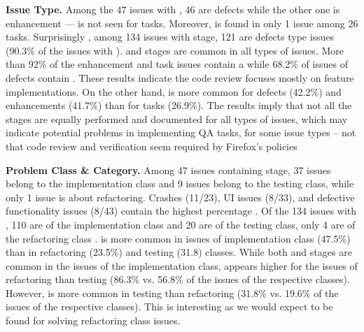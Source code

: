 \textbf{Issue Type.}
Among the 47 issues with \ir, 46 are defects while the other one is enhancement --- \ir is not seen for tasks. Moreover, \ia is found in only 1 issue among 26 tasks. Surprisingly , among 134 issues with \ia stage, 121 are defects type issues (90.3\% of the issues with \ia). \sd and \impl stages are common in all types of issues. More than 92\% of the enhancement and task issues contain a \crv while 68.2\% of issues of defects contain \crv. These results indicate the code review focuses mostly on feature implementations. 
On the other hand, \ver is more common for defects (42.2\%) and enhancements (41.7\%) than  for tasks (26.9\%). The results imply that not all the stages are equally performed and documented for all types of issues, which may indicate potential problems in implementing QA tasks, for some issue types -- not that code review and verification seem  required by Firefox's policies


\textbf{Problem Class \& Category.} 
Among 47 issues containing \ir stage, 37 issues belong to the implementation class and 9 issues belong to the testing class, while only 1 issue is about refactoring. Crashes (11/23), UI issues (8/33), and defective functionality issues (8/43) contain the highest percentage \ir. Of the 134 issues with \ia, 110 are of the implementation class and 20 are of the testing class, only 4 are of the refactoring class . \sd is more common in issues of implementation class (47.5\%) than in refactoring (23.5\%) and testing (31.8) classes. 
While both \crv and \ver stages are common in the issues of the implementation class, \crv appears higher for the issues of refactoring than testing (86.3\% vs. 56.8\% of the issues of the respective classes). %
However, \ver is more common in testing than refactoring (31.8\% vs. 19.6\% of the issues of the respective classes). This is interesting as we would expect \ver to be found for solving refactoring class issues. 





